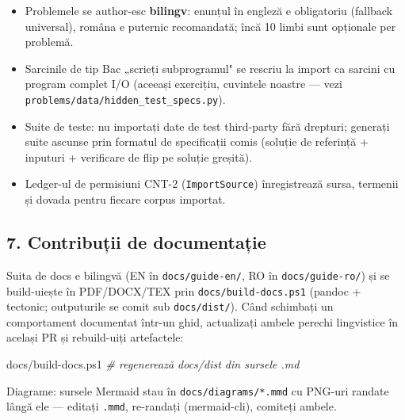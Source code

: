\documentclass[
]{article}
\newenvironment{Shaded}{}{}
\newcommand{\CommentTok}[1]{\textcolor[rgb]{0.38,0.63,0.69}{\textit{#1}}}
\newcommand{\FunctionTok}[1]{\textcolor[rgb]{0.02,0.16,0.49}{#1}}
\newcommand{\NormalTok}[1]{#1}
\newcommand{\OperatorTok}[1]{\textcolor[rgb]{0.40,0.40,0.40}{#1}}
\providecommand{\tightlist}{%
  \setlength{\itemsep}{0pt}\setlength{\parskip}{0pt}}
\begin{document}
\begin{itemize}
\tightlist
\item
  Problemele se author-esc \textbf{bilingv}: enunțul în engleză e
  obligatoriu (fallback universal), româna e puternic recomandată; încă
  10 limbi sunt opționale per problemă.
\item
  Sarcinile de tip Bac „scrieți subprogramul" se rescriu la import ca
  sarcini cu program complet I/O (aceeași exercițiu, cuvintele noastre
  --- vezi \texttt{problems/data/hidden\_test\_specs.py}).
\item
  Suite de teste: nu importați date de test third-party fără drepturi;
  generați suite ascunse prin formatul de specificații comis (soluție de
  referință + inputuri + verificare de flip pe soluție greșită).
\item
  Ledger-ul de permisiuni CNT-2 (\texttt{ImportSource}) înregistrează
  sursa, termenii și dovada pentru fiecare corpus importat.
\end{itemize}

\subsection{7. Contribuții de
documentație}\label{7-contribuux21bii-de-documentaux21bie}

Suita de docs e bilingvă (EN în \texttt{docs/guide-en/}, RO în
\texttt{docs/guide-ro/}) și se build-uiește în PDF/DOCX/TEX prin
\texttt{docs/build-docs.ps1} (pandoc + tectonic; outputurile se comit
sub \texttt{docs/dist/}). Când schimbați un comportament documentat
într-un ghid, actualizați ambele perechi lingvistice în același PR și
rebuild-uiți artefactele:

\begin{Shaded}
\begin{Highlighting}[]
\NormalTok{docs}\OperatorTok{/}\NormalTok{build{-}docs}\OperatorTok{.}\FunctionTok{ps1}    \CommentTok{\# regenerează docs/dist din sursele .md}
\end{Highlighting}
\end{Shaded}

Diagrame: sursele Mermaid stau în \texttt{docs/diagrams/*.mmd} cu
PNG-uri randate lângă ele --- editați \texttt{.mmd}, re-randați
(mermaid-cli), comiteți ambele.
\end{document}
